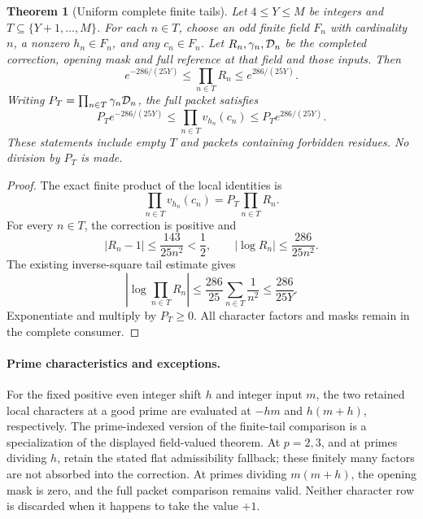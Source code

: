 \documentclass[11pt]{article}
\newtheorem{theorem}{Theorem}[section]
\begin{document}
\begin{theorem}[Uniform complete finite tails]
\label{thm:twistTwoCharacterTail}
Let \(4\leq Y\leq M\) be integers and
\(T\subseteq\{Y+1,\ldots,M\}\). For each \(n\in T\), choose an odd finite
field \(F_n\) with cardinality \(n\), a nonzero \(h_n\in F_n\), and any
\(c_n\in F_n\). Let \(R_n,\gamma_n,{\cal D}_n\) be the completed correction,
opening mask and full reference at that field and those inputs.
Then
\[
 e^{-286/(25Y)}\leq\prod_{n\in T}R_n\leq e^{286/(25Y)}.
\]
Writing \(P_T=\prod_{n\in T}\gamma_n{\cal D}_n\), the full packet satisfies
\[
 P_Te^{-286/(25Y)}
       \leq\prod_{n\in T}v_{h_n}(c_n)
       \leq P_Te^{286/(25Y)}.
\]
These statements include empty \(T\) and packets containing forbidden
residues. No division by \(P_T\) is made.
\end{theorem}

\begin{proof}
The exact finite product of the local identities is
\[
                \prod_{n\in T}v_{h_n}(c_n)
                       =P_T\prod_{n\in T}R_n.
\]
For every \(n\in T\), the correction is positive and
\[
 |R_n-1|\leq\frac{143}{25n^2}<\frac12,\qquad
 |\log R_n|\leq\frac{286}{25n^2}.
\]
The existing inverse-square tail estimate gives
\[
 \left|\log\prod_{n\in T}R_n\right|
       \leq\frac{286}{25}\sum_{n\in T}\frac1{n^2}
       \leq\frac{286}{25Y}.
\]
Exponentiate and multiply by \(P_T\geq0\). All character factors
and masks remain in the complete consumer.
\end{proof}

\paragraph{Prime characteristics and exceptions.}
For the fixed positive even integer shift \(h\) and integer input \(m\), the two
retained local characters at a good prime are evaluated at
\(-hm\) and \(h(m+h)\), respectively. The prime-indexed version of the
finite-tail comparison is a specialization of the displayed field-valued
theorem. At \(p=2,3\), and at primes dividing \(h\), retain the stated flat
admissibility fallback; these finitely many factors are not absorbed into
the correction. At primes dividing \(m(m+h)\), the opening mask is zero,
and the full packet comparison remains valid. Neither character row is
discarded when it happens to take the value \(+1\).
\end{document}
